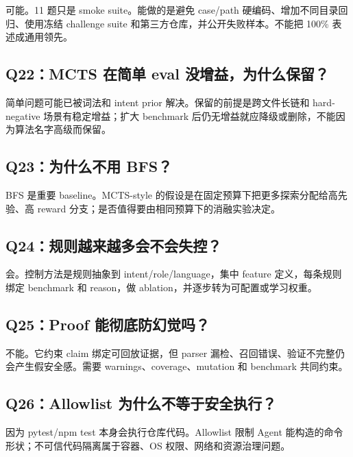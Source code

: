 \documentclass[UTF8,12pt,openany]{ctexbook}
\begin{document}
可能。11 题只是 smoke suite。能做的是避免 case/path 硬编码、增加不同目录回归、使用冻结 challenge suite 和第三方仓库，并公开失败样本。不能把 100\% 表述成通用领先。\par

\subsection{Q22：MCTS 在简单 eval 没增益，为什么保留？}

简单问题可能已被词法和 intent prior 解决。保留的前提是跨文件长链和 hard-negative 场景有稳定增益；扩大 benchmark 后仍无增益就应降级或删除，不能因为算法名字高级而保留。\par

\subsection{Q23：为什么不用 BFS？}

BFS 是重要 baseline。MCTS-style 的假设是在固定预算下把更多探索分配给高先验、高 reward 分支；是否值得要由相同预算下的消融实验决定。\par

\subsection{Q24：规则越来越多会不会失控？}

会。控制方法是规则抽象到 intent/role/language，集中 feature 定义，每条规则绑定 benchmark 和 reason，做 ablation，并逐步转为可配置或学习权重。\par

\subsection{Q25：Proof 能彻底防幻觉吗？}

不能。它约束 claim 绑定可回放证据，但 parser 漏检、召回错误、验证不完整仍会产生假安全感。需要 warnings、coverage、mutation 和 benchmark 共同约束。\par

\subsection{Q26：Allowlist 为什么不等于安全执行？}

因为 pytest/npm test 本身会执行仓库代码。Allowlist 限制 Agent 能构造的命令形状；不可信代码隔离属于容器、OS 权限、网络和资源治理问题。\par
\end{document}
